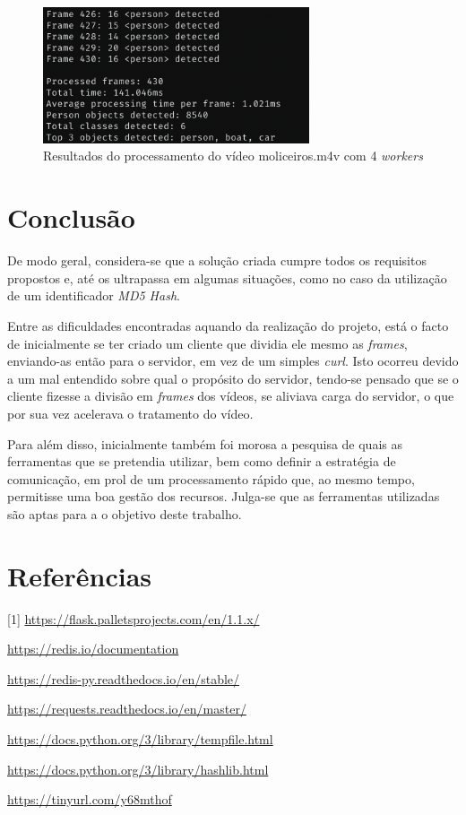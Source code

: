 \documentclass[10pt,portuguese]{article}
\begin{document}
    \begin{figure}[!h]
        \centering
        \includegraphics[width=0.7\textwidth]{4workers.png}
        \caption{Resultados do processamento do vídeo moliceiros.m4v com 4 \textit{workers}} 
    \end{figure}
\newpage
\section{Conclusão}
\par De modo geral, considera-se que a solução criada cumpre todos os requisitos propostos e, até os ultrapassa em algumas situações, como no caso da utilização de um identificador \textit{MD5 Hash}. 
\par Entre as dificuldades encontradas aquando da realização do projeto, está o facto de inicialmente se ter criado um cliente que dividia ele mesmo as \textit{frames}, enviando-as então para o servidor, em vez de um simples \textit{curl}. Isto ocorreu devido a um mal entendido sobre qual o propósito do servidor, tendo-se pensado que se o cliente fizesse a divisão em \textit{frames} dos vídeos, se aliviava carga do servidor, o que por sua vez acelerava o tratamento do vídeo. 
\par Para além disso, inicialmente também foi morosa a pesquisa de quais as ferramentas que se pretendia utilizar, bem como definir a estratégia de comunicação, em prol de um processamento rápido que, ao mesmo tempo, permitisse uma boa gestão dos recursos. Julga-se que as ferramentas utilizadas são aptas para a o objetivo deste trabalho. 

\section{Referências}
    
    
    
    [1] \url{https://flask.palletsprojects.com/en/1.1.x/}
    \par
    [2] \url{https://redis.io/documentation}
    \par
    [3] \url{https://redis-py.readthedocs.io/en/stable/}
    \par
    [4] \url{https://requests.readthedocs.io/en/master/}
    \par 
    [5] \url{https://docs.python.org/3/library/tempfile.html}
    \par
    [6] \url{https://docs.python.org/3/library/hashlib.html}
    \par
    [7] \url{https://tinyurl.com/y68mthof}
\end{document}
